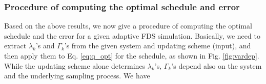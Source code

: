 \documentclass[reprint, superscriptaddress, floatfix]{revtex4-1}
\begin{document}
\subsubsection{\label{sec:procedure}
Procedure of computing the optimal schedule and error
}


Based on the above results,
we now give a procedure of computing
the optimal schedule and the error
for a given adaptive FDS simulation.
%
Basically, we need to extract
$\lambda_k$'s and $\Gamma_k$'s
from the given system and updating scheme (input),
and then apply them to Eq. \eqref{eq:q_opt}
for the schedule,
as shown in Fig. \ref{fig:vardep}.
%
%
While the updating scheme alone
determines $\lambda_k$'s,
$\Gamma_k$'s depend also on the system
and the underlying sampling process.
%
We have
\end{document}
